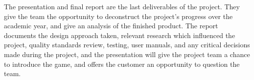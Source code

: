 The presentation and final report are the last deliverables of the project. They give the team the opportunity to deconstruct the project's progress over the academic year, and give an analysis of the finished product. The report documents the design approach taken, relevant research which influenced the project, quality standards review, testing, user manuals, and any critical decisions made during the project, and the presentation will give the project team a chance to introduce the game, and offers the customer an opportunity to question the team. 







